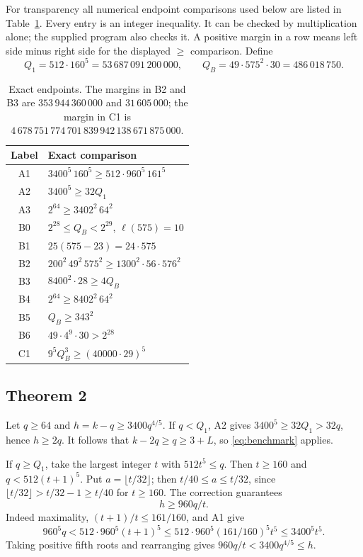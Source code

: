\documentclass[11pt]{amsart}
\theoremstyle{remark}
\newcommand{\QB}{Q_B}
\begin{document}
For transparency all numerical endpoint comparisons used below are
listed in Table~\ref{tab:constants}. Every entry is an integer
inequality. It can be checked by multiplication alone; the supplied
program also checks it. A positive margin in a row means left side
minus right side for the displayed $\ge$ comparison. Define
\[
 Q_1=512\cdot160^5=53\,687\,091\,200\,000,\qquad
 \QB=49\cdot575^2\cdot30=486\,018\,750.
\]
\begin{table}[ht]
\centering\small
\begin{tabular}{@{}cl@{}}
\toprule
Label & Exact comparison\\
\midrule
A1 & $3400^5\,160^5\ge512\cdot960^5\,161^5$\\
A2 & $3400^5\ge32Q_1$\\
A3 & $2^{64}\ge3402^2\,64^2$\\
B0 & $2^{28}\le\QB<2^{29}$, $\ell(575)=10$\\
B1 & $25(575-23)=24\cdot575$\\
B2 & $200^2\,49^2\,575^2\ge1300^2\cdot56\cdot576^2$\\
B3 & $8400^2\cdot28\ge4\QB$\\
B4 & $2^{64}\ge8402^2\,64^2$\\
B5 & $\QB\ge343^2$\\
B6 & $49\cdot4^9\cdot30>2^{28}$\\
C1 & $9^5\QB^3\ge(40000\cdot29)^5$\\
\bottomrule
\end{tabular}
\caption{Exact endpoints. The margins in B2 and B3 are
$353\,944\,360\,000$ and $31\,605\,000$; the margin in C1 is
$4\,678\,751\,774\,701\,839\,942\,138\,671\,875\,000$.}
\label{tab:constants}
\end{table}

\subsection{Theorem 2}
Let $q\ge64$ and $h=k-q\ge3400q^{4/5}$. If $q<Q_1$, A2 gives
$3400^5\ge32Q_1>32q$, hence $h\ge2q$. It follows that
$k-2q\ge q\ge3+L$, so \eqref{eq:benchmark} applies.

If $q\ge Q_1$, take the largest integer $t$ with $512t^5\le q$.
Then $t\ge160$ and $q<512(t+1)^5$. Put $a=\lfloor t/32\rfloor$;
then $t/40\le a\le t/32$, since
$\lfloor t/32\rfloor>t/32-1\ge t/40$ for $t\ge160$.
The correction guarantees
\begin{equation}\label{eq:A-h}
 h\ge960q/t.
\end{equation}
Indeed maximality, $(t+1)/t\le161/160$, and A1 give
\[
 960^5q<512\cdot960^5(t+1)^5
 \le512\cdot960^5(161/160)^5t^5\le3400^5t^5.
\]
Taking positive fifth roots and rearranging gives
$960q/t<3400q^{4/5}\le h$.
\end{document}
